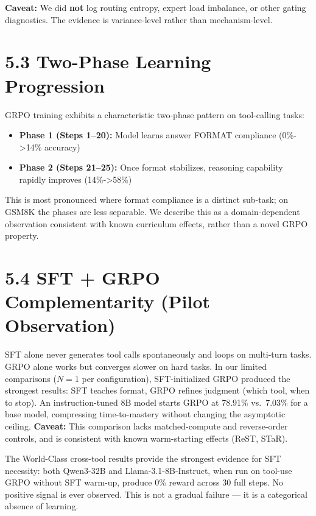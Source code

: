 \documentclass[
  american,
  11pt,
  a4paper,
  oneside]{report}
\providecommand{\tightlist}{%
  \setlength{\itemsep}{0pt}\setlength{\parskip}{0pt}}
\begin{document}
\textbf{Caveat:} We did \textbf{not} log routing entropy, expert load
imbalance, or other gating diagnostics. The evidence is variance-level
rather than mechanism-level.

\section{5.3 Two-Phase Learning
Progression}\label{two-phase-learning-progression}

GRPO training exhibits a characteristic two-phase pattern on
tool-calling tasks:

\begin{itemize}
\tightlist
\item
  \textbf{Phase 1 (Steps 1--20):} Model learns answer FORMAT compliance
  (0\%-\textgreater14\% accuracy)
\item
  \textbf{Phase 2 (Steps 21--25):} Once format stabilizes, reasoning
  capability rapidly improves (14\%-\textgreater58\%)
\end{itemize}

This is most pronounced where format compliance is a distinct sub-task;
on GSM8K the phases are less separable. We describe this as a
domain-dependent observation consistent with known curriculum effects,
rather than a novel GRPO property.

\section{5.4 SFT + GRPO Complementarity (Pilot
Observation)}\label{sft-grpo-complementarity-pilot-observation}

SFT alone never generates tool calls spontaneously and loops on
multi-turn tasks. GRPO alone works but converges slower on hard tasks.
In our limited comparisons (\(N{=}1\) per configuration),
SFT-initialized GRPO produced the strongest results: SFT teaches format,
GRPO refines judgment (which tool, when to stop). An instruction-tuned
8B model starts GRPO at 78.91\% vs.~7.03\% for a base model, compressing
time-to-mastery without changing the asymptotic ceiling.
\textbf{Caveat:} This comparison lacks matched-compute and reverse-order
controls, and is consistent with known warm-starting effects (ReST,
STaR).

The World-Class cross-tool results provide the strongest evidence for
SFT necessity: both Qwen3-32B and Llama-3.1-8B-Instruct, when run on
tool-use GRPO without SFT warm-up, produce 0\% reward across 30 full
steps. No positive signal is ever observed. This is not a gradual
failure --- it is a categorical absence of learning.
\end{document}
